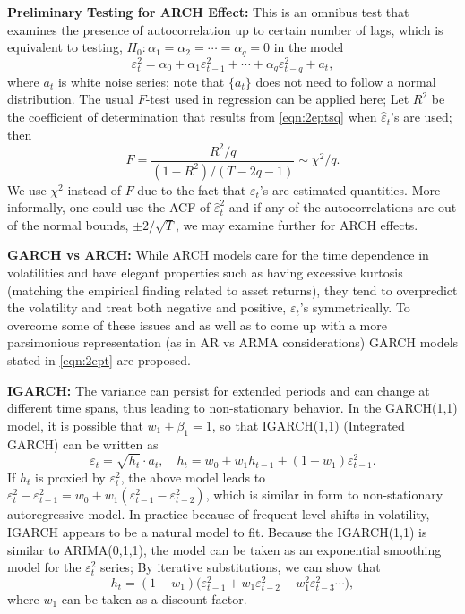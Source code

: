 \noindent\textbf{Preliminary Testing for ARCH Effect:} This is an omnibus test that examines the presence of autocorrelation up to certain number of lags, which is equivalent to testing, $H_0: \alpha_1 = \alpha_2= \cdots = \alpha_q = 0$ in the model
	\begin{equation} \label{eqn:2eptsq}
	\varepsilon_t^2 = \alpha_0 + \alpha_1 \varepsilon_{t-1}^2 + \cdots + \alpha_q \varepsilon_{t-q}^2 + a_t,
	\end{equation}
where $a_t$ is white noise series; note that $\{ a_t \}$ does not need to follow a normal distribution. The usual $F$-test used in regression can be applied here; Let $R^2$ be the coefficient of determination that results from \eqref{eqn:2eptsq} when $\hat{\varepsilon}_t$'s are used; then
	\begin{equation} \label{eqn:2F}
	F = \frac{R^2/q}{(1 - R^2)/(T - 2q - 1)} \sim \chi^2/q.
	\end{equation}
We use $\chi^2$ instead of $F$ due to the fact that $\varepsilon_t$'s are estimated quantities. More informally, one could use the ACF of $\hat{\varepsilon}_t^2$ and if any of the autocorrelations are out of the normal bounds, $\pm 2/\sqrt{T}$, we may examine further for ARCH effects. \twomedskip


\noindent\textbf{GARCH vs ARCH:} While ARCH models care for the time dependence in volatilities and have elegant properties such as having excessive kurtosis (matching the empirical finding related to asset returns), they tend to overpredict the volatility and treat both negative and positive, $\varepsilon_t$'s symmetrically. To overcome some of these issues and as well as to come up with a more parsimonious representation (as in AR vs ARMA considerations) GARCH models stated in \eqref{eqn:2ept} are proposed. \twomedskip


\noindent\textbf{IGARCH:} The variance can persist for extended periods and can change at different time spans, thus leading to non-stationary behavior. In the GARCH(1,1) model, it is possible that $w_1 + \beta_1 = 1$, so that IGARCH(1,1) (Integrated GARCH) can be written as
	\begin{equation} \label{eqn:2eptsqrt}
	\varepsilon_t = \sqrt{h_t} \cdot a_t, \quad h_t = w_0 + w_1h_{t-1} + (1 - w_1) \varepsilon_{t-1}^2.
	\end{equation}
If $h_t$ is proxied by $\varepsilon_t^2$, the above model leads to $\varepsilon_t^2 - \varepsilon_{t-1}^2 = w_0 + w_1(\varepsilon_{t-1}^2 - \varepsilon_{t-2}^2)$, which is similar in form to non-stationary autoregressive model. In practice because of frequent level shifts in volatility, IGARCH appears to be a natural model to fit. Because the IGARCH(1,1) is similar to ARIMA(0,1,1), the model can be taken as an exponential smoothing model for the $\varepsilon_t^2$ series; By iterative substitutions, we can show that
	\begin{equation} \label{eqn:2ht1w}
	h_t = (1 - w_1) \big( \varepsilon_{t-1}^2 + w_1 \varepsilon_{t-2}^2 + w_1^2 \varepsilon_{t-3}^2 \cdots \big),
	\end{equation}
where $w_1$ can be taken as a discount factor. \twomedskip


